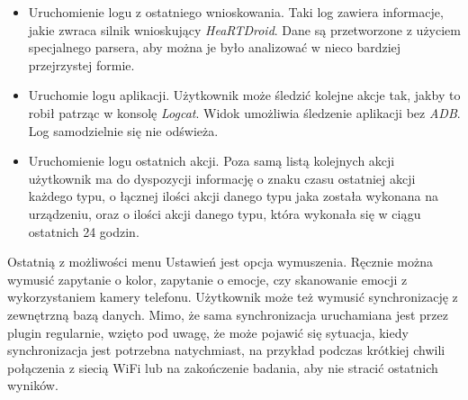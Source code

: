\begin{itemize}
	\item Uruchomienie logu z ostatniego wnioskowania. Taki log zawiera informacje, jakie zwraca silnik wnioskujący \textit{HeaRTDroid}. Dane są przetworzone z użyciem specjalnego parsera, aby można je było analizować w nieco bardziej przejrzystej formie.
	
	\item Uruchomie logu aplikacji. Użytkownik może śledzić kolejne akcje tak, jakby to robił patrząc w konsolę \textit{Logcat}. Widok umożliwia śledzenie aplikacji bez \textit{ADB}. Log samodzielnie się nie odświeża.
	
	\item Uruchomienie logu ostatnich akcji. Poza samą listą kolejnych akcji użytkownik ma do dyspozycji informację o znaku czasu ostatniej akcji każdego typu, o łącznej ilości akcji danego typu jaka została wykonana na urządzeniu, oraz o ilości akcji danego typu, która wykonała się w ciągu ostatnich 24 godzin.
\end{itemize}

Ostatnią z możliwości menu Ustawień jest opcja wymuszenia. Ręcznie można wymusić zapytanie o kolor, zapytanie o emocje, czy skanowanie emocji z wykorzystaniem kamery telefonu. Użytkownik może też wymusić synchronizację z zewnętrzną bazą danych. Mimo, że sama synchronizacja uruchamiana jest przez plugin regularnie, wzięto pod uwagę, że może pojawić się sytuacja, kiedy synchronizacja jest potrzebna natychmiast, na przykład podczas krótkiej chwili połączenia z siecią WiFi lub na zakończenie badania, aby nie stracić ostatnich wyników.

